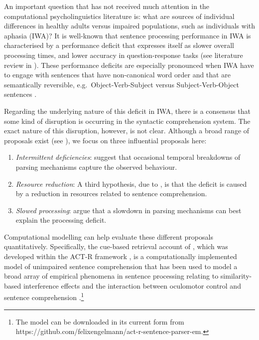 \documentclass[10pt,letterpaper]{article}
\begin{document}
An important question that has not received much attention in the computational psycholinguistics literature is: what are sources of individual differences in healthy adults versus impaired populations, such as individuals with aphasia (IWA)? 
It is well-known that
sentence processing performance in IWA is characterised by a performance deficit that expresses itself as slower overall processing times, and lower accuracy in question-response tasks (see literature review in ). 
These performance deficits are especially pronounced when IWA have to engage with sentences that have non-canonical word order and that are semantically reversible, e.g.\ Object-Verb-Subject versus Subject-Verb-Object sentences \cite{hanneetal11}. 

Regarding the underlying nature of this deficit in IWA, there is a consensus that some kind of disruption is occurring in the syntactic comprehension system. The exact nature of this disruption, however, is not clear. 
Although a broad range of proposals exist (see ), 
we focus on three influential proposals here:
\begin{enumerate}
\item \textit{Intermittent deficiencies}:
 suggest that occasional temporal breakdowns of parsing mechanisms capture the observed behaviour. 
\item \textit{Resource reduction}:
A third hypothesis, due to ,  is that the deficit is caused by a reduction in resources related to sentence comprehension. 
\item \textit{Slowed processing}:
 argue that a slowdown in parsing mechanisms can best explain the processing deficit.  
\end{enumerate} 

Computational modelling can help evaluate these different proposals quantitatively. 
Specifically, the cue-based retrieval account of , which was developed within the ACT-R framework \cite{AndersonEtAl2004}, is a computationally implemented model of unimpaired sentence comprehension 
 that has been used to model a broad array of empirical phenomena in sentence processing relating to similarity-based interference effects 
\cite{LewisVasishth2005,NicenboimVasishth2017StanCon,VBLD07,EngelmannJaegerVasishthSubmitted2016} and the interaction between oculomotor control and  sentence comprehension \cite{Engelmanna}.\footnote{The model can be downloaded in its current form from 
https://github.com/felixengelmann/act-r-sentence-parser-em.}
\end{document}
